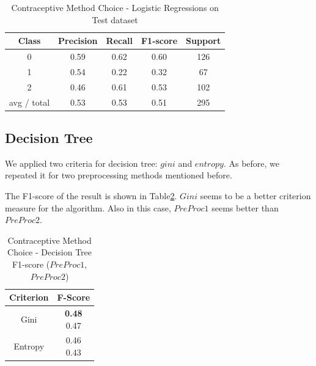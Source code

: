 \begin{table}[p]
\begin{center}
\begin{tabular}{|c|c|c|c|c|}
\hline Class & Precision & Recall & F1-score & Support \\

\hline 0 & 0.59 & 0.62 & 0.60 & 126\\
\hline 1 & 0.54 & 0.22 & 0.32 & 67\\
\hline 2 & 0.46 & 0.61 & 0.53 & 102\\
\hline avg / total & 0.53 & 0.53 & 0.51 & 295\\
\hline
\end{tabular}

\caption{Contraceptive Method Choice - Logistic Regressions on Test dataset}
\label{table:db1-logisticregression-test}
\end{center}
\end{table}

\subsection{Decision Tree}
We applied two criteria for decision tree: $gini$ and $entropy$. As before, we repeated it for two preprocessing methods mentioned before.

The F1-score of the result is shown in Table\ref{table:db1-decisiontree}. $Gini$ seems to be a better criterion measure for the algorithm. Also in this case, $PreProc1$ seems better than $PreProc2$.


\begin{table}[p]
\begin{center}
\begin{tabular}{|c|c|}
\hline Criterion & F-Score \\

\hline Gini & \minibox{\textbf{0.48}\\ 0.47} \\

\hline Entropy & \minibox{0.46\\ 0.43} \\

\hline
\end{tabular}

\caption{Contraceptive Method Choice - Decision Tree F1-score ($PreProc1$, $PreProc2$)}
\label{table:db1-decisiontree}
\end{center}
\end{table}

